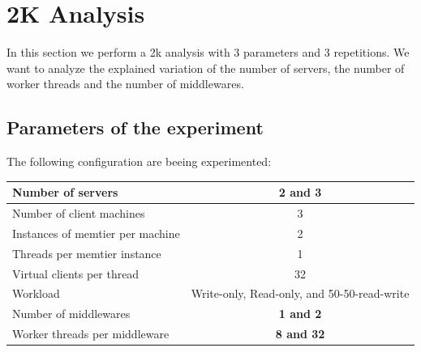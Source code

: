 \documentclass[11pt,a4paper]{article}
\begin{document}
\section{2K Analysis}
In this section we perform a 2k analysis with 3 parameters and 3 repetitions. We want to analyze the explained variation of the number of servers, the number of worker threads and the number of middlewares. 
\subsection{Parameters of the experiment}
The following configuration are beeing experimented:
\begin{center}
	\scriptsize{
		\begin{tabular}{|l|c|}
			\hline Number of servers                & \textbf{2 and 3}                                     \\ 
			\hline Number of client machines        & 3                                           \\ 
			\hline Instances of memtier per machine & 2                                           \\ 
			\hline Threads per memtier instance     & 1                                           \\
			\hline Virtual clients per thread       & 32                                     \\ 
			\hline Workload                         & Write-only, Read-only, and 50-50-read-write \\
			\hline Number of middlewares            & \textbf{1 and 2}                                     \\
			\hline Worker threads per middleware    & \textbf{8 and 32}                                    \\
			\hline 
		\end{tabular}
	} 
\end{center}
\end{document}
